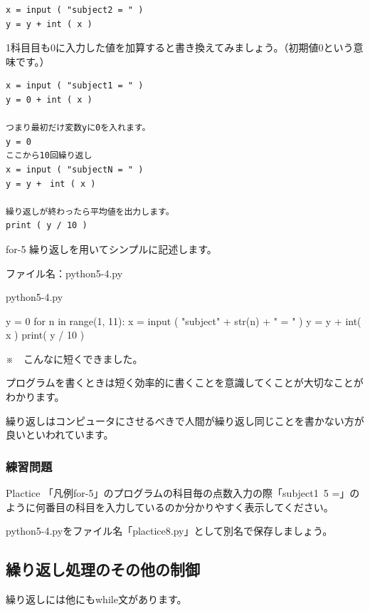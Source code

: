 \documentclass[11pt,a4paper,dvipdfmx,titlepage]{jsreport}
\begin{document}
\begin{verbatim}
x = input ( "subject2 = " )
y = y + int ( x ) 
\end{verbatim}

1科目目も0に入力した値を加算すると書き換えてみましょう。（初期値0という意味です。）
\begin{verbatim}
x = input ( "subject1 = " )
y = 0 + int ( x ) 

つまり最初だけ変数yに0を入れます。
y = 0
ここから10回繰り返し
x = input ( "subjectN = " )
y = y +　int ( x )

繰り返しが終わったら平均値を出力します。
print ( y / 10 )
\end{verbatim}

\begin{pabox}{for-5}
繰り返しを用いてシンプルに記述します。

ファイル名：python5-4.py
\begin{codebox}{python5-4.py}
\begin{listing}{1}
y = 0
for n in range(1, 11):
    x = input ( "subject" + str(n) + " = " )
    y = y + int( x )
print( y / 10 )
\end{listing}
\end{codebox}
※　こんなに短くできました。

\end{pabox}

プログラムを書くときは短く効率的に書くことを意識してくことが大切なことがわかります。

繰り返しはコンピュータにさせるべきで人間が繰り返し同じことを書かない方が良いといわれています。

\subsubsection{練習問題}
\begin{plabox}{Plactice}
「凡例for-5」のプログラムの科目毎の点数入力の際「subject1~5 =」のように何番目の科目を入力しているのか分かりやすく表示してください。

python5-4.pyをファイル名「plactice8.py」として別名で保存しましょう。

\end{plabox}
\subsection{繰り返し処理のその他の制御}

繰り返しには他にもwhile文があります。
\end{document}
